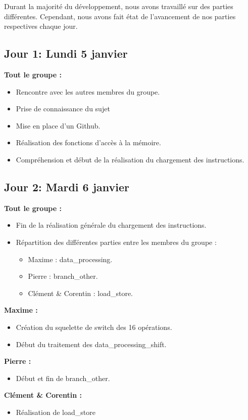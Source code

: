 \documentclass[11pt]{article} %
\begin{document}
Durant la majorit\'e du d\'eveloppement, nous avons travaill\'e sur des parties diff\'erentes. Cependant, nous avons fait \'etat de l'avancement de nos parties respectives chaque jour.

\subsection{Jour 1: Lundi 5 janvier}

\textbf{Tout le groupe :}
\begin{itemize}
  \item Rencontre avec les autres membres du groupe.
  \item Prise de connaissance du sujet
  \item Mise en place d'un Github.
  \item Réalisation des fonctions d'acc\`es \`a la m\'emoire.
  \item Compr\'ehension et début de la r\'ealisation du chargement des instructions.
\end{itemize}

\subsection{Jour 2: Mardi 6 janvier}
\textbf{Tout le groupe :}
\begin{itemize}
  \item Fin de la r\'ealisation g\'en\'erale du chargement des instructions.
  \item R\'epartition des diff\'erentes parties entre les membres du groupe :
  \begin{itemize}
    \item Maxime : data\_processing.
    \item Pierre : branch\_other.
    \item Cl\'ement \& Corentin : load\_store.
  \end{itemize}
\end{itemize}
\textbf{Maxime :}
\begin{itemize}
  \item Cr\'eation du squelette de switch des 16 op\'erations.
  \item D\'ebut du traitement des data\_processing\_shift.
\end{itemize}
\textbf{Pierre :}
\begin{itemize}
  \item D\'ebut et fin de branch\_other.
\end{itemize}
\textbf{Cl\'ement \& Corentin :}
\begin{itemize}
  \item R\'ealisation de load\_store
\end{itemize}
\end{document}
